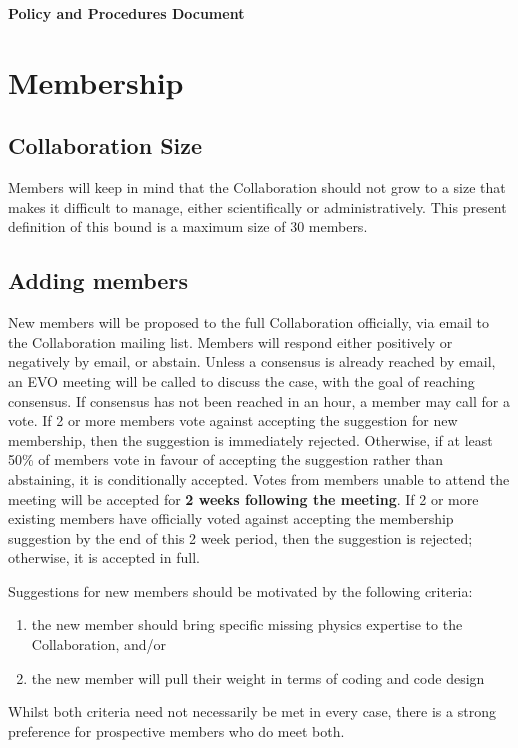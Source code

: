 

\centerline{\textbf{Policy and Procedures Document}}\bigskip 


\section{Membership}

\subsection{Collaboration Size}

Members will keep in mind that the Collaboration should not grow to a size that makes it difficult to manage, either scientifically or administratively.  This present definition of this bound is a maximum size of 30 members.

\subsection{Adding members}

New members will be proposed to the full Collaboration officially, via email to the Collaboration mailing list.  Members will respond either positively or negatively by email, or abstain.  Unless a consensus is already reached by email, an EVO meeting will be called to discuss the case, with the goal of reaching consensus.  If consensus has not been reached in an hour, a member may call for a vote.  If 2 or more members vote against accepting the suggestion for new membership, then the suggestion is immediately rejected.  Otherwise, if at least 50\% of members vote in favour of accepting the suggestion rather than abstaining, it is conditionally accepted.  Votes from members unable to attend the meeting will be accepted for \textbf{2 weeks following the meeting}.  If 2 or more existing members have officially voted against accepting the membership suggestion by the end of this 2 week period, then the suggestion is rejected; otherwise, it is accepted in full.

Suggestions for new members should be motivated by the following criteria:
\begin{enumerate}
\item the new member should bring specific missing physics expertise to the Collaboration, and/or
\item the new member will pull their weight in terms of coding and code design
\end{enumerate}
Whilst both criteria need not necessarily be met in every case, there is a strong preference for prospective members who do meet both.  


